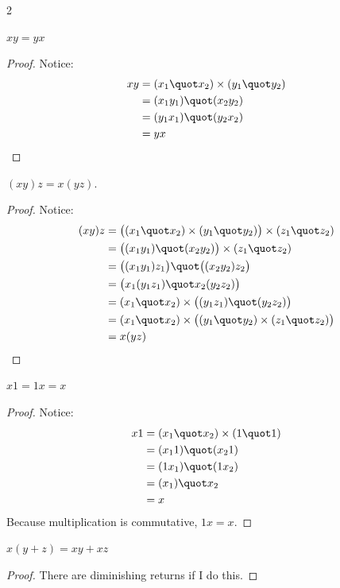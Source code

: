 \begin{multicols}{2}
\begin{proposition}
	$xy = yx$
\end{proposition}
\begin{proof}
    Notice:
    \begin{align*}
        xy &= (x_1 \quot x_2) \times (y_1 \quot y_2) \\
        &= (x_1 y_1) \quot (x_2 y_2) \\
        &= (y_1 x_1) \quot (y_2 x_2) \\
        &= yx 
    \end{align*}
\end{proof}

\begin{proposition}
	$(xy)z = x(yz)$.
\end{proposition}
\begin{proof}
    Notice:
	\begin{align*}
        (xy)z &= \big((x_1 \quot x_2) \times (y_1 \quot y_2) \big) \times (z_1 \quot z_2) \\
        &= \big((x_1 y_1) \quot (x_2 y_2) \big) \times (z_1 \quot z_2) \\
        &=  \big((x_1 y_1) z_1 \big)\quot \big((x_2 y_2) z_2 \big)\\
        &= \big(x_1 (y_1 z_1) \quot x_2 (y_2 z_2)\big) \\
        &= (x_1 \quot x_2) \times \big((y_1 z_1) \quot (y_2 z_2) \big) \\
        &= (x_1 \quot x_2) \times \big( (y_1 \quot y_2) \times (z_1 \quot z_2) \big) \\
        &= x(yz)
    \end{align*}
\end{proof}

\begin{proposition}
	$x1 = 1x = x$
\end{proposition}
\begin{proof}
    Notice:
    \begin{align*}
        x1 &= (x_1 \quot x_2) \times (1 \quot 1) \\
        &= (x_1 1) \quot (x_2 1) \\
        &= (1x_1) \quot (1 x_2) \\
        &= (x_1) \quot x_2 \\
        &= x
    \end{align*}
    Because multiplication is commutative, $1x = x$.
\end{proof}
\begin{proposition}
	$x(y+z) = xy +xz$
\end{proposition}
\begin{proof}
    There are diminishing returns if I do this.
\end{proof}


\end{multicols}
